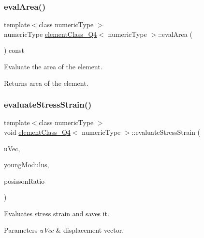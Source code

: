 \subsubsection{\texorpdfstring{eval\+Area()}{evalArea()}}
{\footnotesize\ttfamily template$<$class numeric\+Type $>$ \\
numeric\+Type \mbox{\hyperlink{classelement_class___q4}{element\+Class\+\_\+\+Q4}}$<$ numeric\+Type $>$\+::eval\+Area (\begin{DoxyParamCaption}{ }\end{DoxyParamCaption}) const}

Evaluate the area of the element. \begin{DoxyReturn}{Returns}
area of the element. 
\end{DoxyReturn}
\mbox{\label{classelement_class___q4_aa1be80202b67c397bfccbd406bb8e88f}} 
\subsubsection{\texorpdfstring{evaluate\+Stress\+Strain()}{evaluateStressStrain()}}
{\footnotesize\ttfamily template$<$class numeric\+Type $>$ \\
void \mbox{\hyperlink{classelement_class___q4}{element\+Class\+\_\+\+Q4}}$<$ numeric\+Type $>$\+::evaluate\+Stress\+Strain (\begin{DoxyParamCaption}\item[{const Matrix$<$ numeric\+Type, 8, 1 $>$ \&}]{u\+Vec,  }\item[{numeric\+Type}]{young\+Modulus,  }\item[{numeric\+Type}]{posisson\+Ratio }\end{DoxyParamCaption})}

Evaluates stress strain and saves it. 
\begin{DoxyParams}{Parameters}
{\em u\+Vec} & displacement vector. \\
\hline
\end{DoxyParams}
\mbox{\label{classelement_class___q4_a8fe7247b89edfe1c70d3d81e6607d27a}} 
